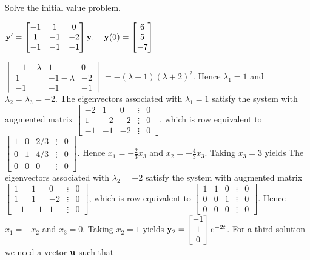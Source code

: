 \documentclass{ximera}
\begin{document}
 \begin{problem}\label{exer:10.5.18}  
 Solve the initial value problem.
 
 $ {\bf y}'
= \begin{bmatrix}-1&1&0\\1&-1&-2\\-1&-1&-1\end{bmatrix}{\bf y},\quad
{\bf y}(0)= \begin{bmatrix}6\\5\\-7\end{bmatrix}$

\begin{solution}
    $ \begin{vmatrix}-1-\lambda&1&0\\1&-1-\lambda&-2\\-1&-1&-1\end{vmatrix}
=-(\lambda-1)(\lambda+2)^2$.
Hence $\lambda_1=1$ and  $\lambda_2=\lambda_3=-2$.
The eigenvectors associated
 with $\lambda_1=1$ satisfy the system with  augmented matrix
$  \begin{bmatrix}{-2}&1&0&\vdots&0\\1&-2&-2&
\vdots&0\\-1&-1&-2&\vdots&0 \end{bmatrix}$,
which is row equivalent to
$  \begin{bmatrix}1&0&2/3&\vdots&0\\0&1&4/3&
\vdots&0\\0&0&0&\vdots&0 \end{bmatrix}$.
Hence  $x_1=-\frac{2 }{3}x_3$ and $x_2=-\frac{4 }{3}x_3$.  Taking
$x_3=3$ yields
The eigenvectors associated
 with $\lambda_2=-2$ satisfy the system with  augmented matrix
$  \begin{bmatrix}1&1&0&\vdots&0\\1&1&-2&
\vdots&0\\-1&-1&1&\vdots&0 \end{bmatrix}$,
which is row equivalent to
$  \begin{bmatrix}1&1&0&\vdots&0\\0&0&1&
\vdots&0\\0&0&0&\vdots&0 \end{bmatrix}$.
Hence  $x_1=-x_2$ and $x_3=0$.  Taking $x_2=1$
yields
${\bf y}_2=  \begin{bmatrix}-1\\1\\0\end{bmatrix}e^{-2t}$.
For a third solution we need a vector ${\bf u}$ such that

\end{solution}
\end{problem}
\end{document}

